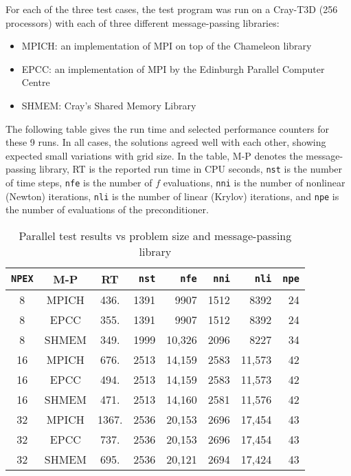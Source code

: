 For each of the three test cases, the test program was run on a Cray-T3D
(256 processors) with each of three different message-passing libraries:

\begin{itemize}
\item  MPICH: an implementation of MPI on top of the Chameleon library

\item  EPCC: an implementation of MPI by the Edinburgh Parallel Computer
Centre

\item  SHMEM: Cray's Shared Memory Library
\end{itemize}

The following table gives the run time and selected performance counters for
these 9 runs. In all cases, the solutions agreed well with each other,
showing expected small variations with grid size. In the table, M-P denotes
the message-passing library, RT is the reported run time in CPU seconds, 
{\tt nst} is the number of time steps, {\tt nfe} is the number of $f$
evaluations, {\tt nni} is the number of nonlinear (Newton) iterations,
{\tt nli} is the number of linear (Krylov) iterations, and {\tt npe} is the
number of evaluations of the preconditioner.

\begin{table}[htb]
\begin{center}
\begin{tabular}{|c|c|c|r|r|r|r|r|}
\hline
{\tt NPEX} & M-P & RT & {\tt nst} & {\tt nfe} & {\tt nni} & {\tt nli} & 
{\tt npe} \\ \hline\hline
8 & MPICH & 436. & 1391 & 9907 & 1512 & 8392 & 24 \\ \hline
8 & EPCC & 355. & 1391 & 9907 & 1512 & 8392 & 24 \\ \hline
8 & SHMEM & 349. & 1999 & 10,326 & 2096 & 8227 & 34 \\ \hline\hline
16 & MPICH & 676. & 2513 & 14,159 & 2583 & 11,573 & 42 \\ \hline
16 & EPCC & 494. & 2513 & 14,159 & 2583 & 11,573 & 42 \\ \hline
16 & SHMEM & 471. & 2513 & 14,160 & 2581 & 11,576 & 42 \\ \hline\hline
32 & MPICH & 1367. & 2536 & 20,153 & 2696 & 17,454 & 43 \\ \hline
32 & EPCC & 737. & 2536 & 20,153 & 2696 & 17,454 & 43 \\ \hline
32 & SHMEM & 695. & 2536 & 20,121 & 2694 & 17,424 & 43 \\ \hline
\end{tabular}
\label{testtable}
\end{center}
\caption{Parallel {\cvode} test results vs problem size and message-passing library}
\end{table}

